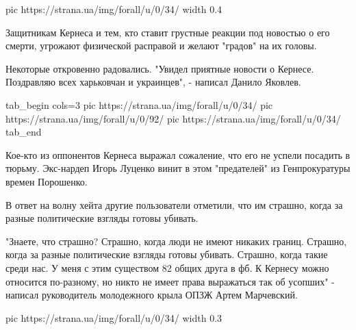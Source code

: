 \ifcmt
pic https://strana.ua/img/forall/u/0/34/%
width 0.4
\fi

Защитникам Кернеса и тем, кто ставит грустные реакции под новостью о его
смерти, угрожают физической расправой и желают "градов" на их головы.

Некоторые откровенно радовались. "Увидел приятные новости о Кернесе. Поздравляю
всех харьковчан и украинцев", - написал Данило Яковлев.

\ifcmt
tab_begin cols=3
pic https://strana.ua/img/forall/u/0/34/%
pic https://strana.ua/img/forall/u/0/92/%
pic https://strana.ua/img/forall/u/0/34/%
tab_end
\fi

Кое-кто из оппонентов Кернеса выражал сожаление, что его не успели посадить в
тюрьму. Экс-нардеп Игорь Луценко винит в этом "предателей" из Генпрокуратуры
времен Порошенко. 

В ответ на волну хейта другие пользователи отметили, что им страшно, когда за
разные политические взгляды готовы убивать.

\obeycr
"Знаете, что страшно?
Страшно, когда люди не имеют никаких границ.
Страшно, когда за разные политические взгляды готовы убивать.
Страшно, когда такие среди нас.
У меня с этим существом 82 общих друга в фб.
К Кернесу можно относится по-разному, но никто не имеет права выражаться так об усопших" - написал руководитель молодежного крыла ОПЗЖ Артем Марчевский.
\restorecr

\ifcmt
pic https://strana.ua/img/forall/u/0/34/%
width 0.3
\fi
